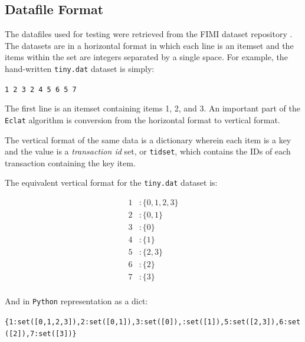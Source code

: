 \documentclass[11pt]{article}
\begin{document}
\begin{multicols}{2}
\section{Datafile Format}

The datafiles used for testing were retrieved from the FIMI dataset
repository \cite{fimiDatasetRepo}.  The datasets are in a horizontal
format in which each line is an itemset and the items within the set
are integers separated by a single space.  For example, the
hand-written \texttt{tiny.dat} dataset is simply:

\texttt{1 2 3 2 4 5 6 5 7}

The first line is an itemset containing items 1, 2, and 3.  An
important part of the \texttt{Eclat} algorithm is conversion from the
horizontal format to vertical format.

The vertical format of the same data is a dictionary wherein each item
is a key and the value is a \emph{transaction id} set, or
\texttt{tidset}, which contains the IDs of each transaction containing
the key item.

The equivalent vertical format for the \texttt{tiny.dat} dataset is:

\begin{align*}
  1 &: \{ 0, 1, 2, 3 \} \\
  2 &: \{ 0, 1 \} \\
  3 &: \{ 0 \} \\
  4 &: \{ 1 \} \\
  5 &: \{ 2, 3 \} \\
  6 &: \{ 2 \} \\
  7 &: \{ 3 \} \\
\end{align*}

And in \texttt{Python} representation as a dict:

\texttt{\{1:set([0,1,2,3]),2:set([0,1]),3:set([0]),:set([1]),5:set([2,3]),6:set([2]),7:set([3])\}}




\end{multicols} %
\end{document}
